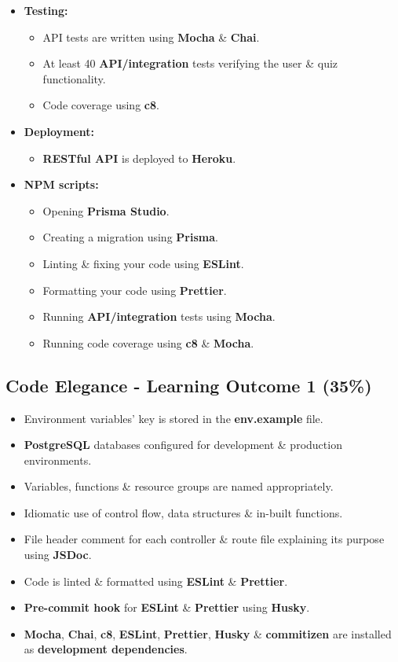 \documentclass{article}
\begin{document}
\begin{itemize}
\begin{itemize}
	\end{itemize}
	\item \textbf{Testing:}
	\begin{itemize}
		\item API tests are written using \textbf{Mocha} \& \textbf{Chai}.
		\item At least 40 \textbf{API/integration} tests verifying the user \& quiz functionality.
		\item Code coverage using \textbf{c8}. 
	\end{itemize}
	\item \textbf{Deployment:}
	\begin{itemize}
		\item \textbf{RESTful API} is deployed to \textbf{Heroku}. 
	\end{itemize}
	\item \textbf{NPM scripts:}
	\begin{itemize}
		\item Opening \textbf{Prisma Studio}.
		\item Creating a migration using \textbf{Prisma}. 
		\item Linting \& fixing your code using \textbf{ESLint}.
		\item Formatting your code using \textbf{Prettier}.
		\item Running \textbf{API/integration} tests using \textbf{Mocha}.
		\item Running code coverage using \textbf{c8} \& \textbf{Mocha}.
	\end{itemize}
\end{itemize}

\subsection*{Code Elegance - Learning Outcome 1 (35\%)}
\begin{itemize}
	\item Environment variables' key is stored in the \textbf{env.example} file. 
	\item \textbf{PostgreSQL} databases configured for development \& production environments.
	\item Variables, functions \& resource groups are named appropriately.
	\item Idiomatic use of control flow, data structures \& in-built functions.
	\item File header comment for each controller \& route file explaining its purpose using \textbf{JSDoc}.
	\item Code is linted \& formatted using \textbf{ESLint} \& \textbf{Prettier}.
	\item \textbf{Pre-commit hook} for \textbf{ESLint} \& \textbf{Prettier} using \textbf{Husky}.
	\item \textbf{Mocha}, \textbf{Chai}, \textbf{c8}, \textbf{ESLint}, \textbf{Prettier}, \textbf{Husky} \& \textbf{commitizen} are installed as \textbf{development dependencies}.	
\end{itemize}
\end{document}
